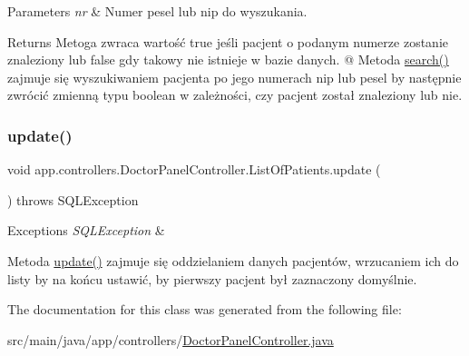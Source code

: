 \begin{DoxyParams}{Parameters}
{\em nr} & Numer pesel lub nip do wyszukania. \\
\hline
\end{DoxyParams}
\begin{DoxyReturn}{Returns}
Metoga zwraca wartość true jeśli pacjent o podanym numerze zostanie znaleziony lub false gdy takowy nie istnieje w bazie danych. @ Metoda \mbox{\hyperlink{classapp_1_1controllers_1_1_doctor_panel_controller_1_1_list_of_patients_aaf2f528dced80e98416b78dd695655fb}{search()}} zajmuje się wyszukiwaniem pacjenta po jego numerach nip lub pesel by następnie zwrócić zmienną typu boolean w zależności, czy pacjent został znaleziony lub nie. 
\end{DoxyReturn}
\mbox{\label{classapp_1_1controllers_1_1_doctor_panel_controller_1_1_list_of_patients_a60e94cce0b803fde7146aa6e16c71958}} 
\subsubsection{\texorpdfstring{update()}{update()}}
{\footnotesize\ttfamily void app.\+controllers.\+Doctor\+Panel\+Controller.\+List\+Of\+Patients.\+update (\begin{DoxyParamCaption}{ }\end{DoxyParamCaption}) throws S\+Q\+L\+Exception}


\begin{DoxyExceptions}{Exceptions}
{\em S\+Q\+L\+Exception} & \\
\hline
\end{DoxyExceptions}
Metoda \mbox{\hyperlink{classapp_1_1controllers_1_1_doctor_panel_controller_1_1_list_of_patients_a60e94cce0b803fde7146aa6e16c71958}{update()}} zajmuje się oddzielaniem danych pacjentów, wrzucaniem ich do listy by na końcu ustawić, by pierwszy pacjent był zaznaczony domyślnie. 

The documentation for this class was generated from the following file\+:\begin{DoxyCompactItemize}
\item 
src/main/java/app/controllers/\mbox{\hyperlink{_doctor_panel_controller_8java}{Doctor\+Panel\+Controller.\+java}}\end{DoxyCompactItemize}
